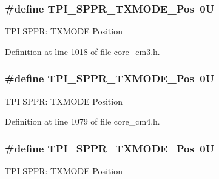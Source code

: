 \subsubsection[{\texorpdfstring{T\+P\+I\+\_\+\+S\+P\+P\+R\+\_\+\+T\+X\+M\+O\+D\+E\+\_\+\+Pos}{TPI_SPPR_TXMODE_Pos}}]{\setlength{\rightskip}{0pt plus 5cm}\#define T\+P\+I\+\_\+\+S\+P\+P\+R\+\_\+\+T\+X\+M\+O\+D\+E\+\_\+\+Pos~0U}\hypertarget{group___c_m_s_i_s___t_p_i_ga0f302797b94bb2da24052082ab630858}{}\label{group___c_m_s_i_s___t_p_i_ga0f302797b94bb2da24052082ab630858}
T\+PI S\+P\+PR\+: T\+X\+M\+O\+DE Position 

Definition at line 1018 of file core\+\_\+cm3.\+h.

\subsubsection[{\texorpdfstring{T\+P\+I\+\_\+\+S\+P\+P\+R\+\_\+\+T\+X\+M\+O\+D\+E\+\_\+\+Pos}{TPI_SPPR_TXMODE_Pos}}]{\setlength{\rightskip}{0pt plus 5cm}\#define T\+P\+I\+\_\+\+S\+P\+P\+R\+\_\+\+T\+X\+M\+O\+D\+E\+\_\+\+Pos~0U}\hypertarget{group___c_m_s_i_s___t_p_i_ga0f302797b94bb2da24052082ab630858}{}\label{group___c_m_s_i_s___t_p_i_ga0f302797b94bb2da24052082ab630858}
T\+PI S\+P\+PR\+: T\+X\+M\+O\+DE Position 

Definition at line 1079 of file core\+\_\+cm4.\+h.

\subsubsection[{\texorpdfstring{T\+P\+I\+\_\+\+S\+P\+P\+R\+\_\+\+T\+X\+M\+O\+D\+E\+\_\+\+Pos}{TPI_SPPR_TXMODE_Pos}}]{\setlength{\rightskip}{0pt plus 5cm}\#define T\+P\+I\+\_\+\+S\+P\+P\+R\+\_\+\+T\+X\+M\+O\+D\+E\+\_\+\+Pos~0U}\hypertarget{group___c_m_s_i_s___t_p_i_ga0f302797b94bb2da24052082ab630858}{}\label{group___c_m_s_i_s___t_p_i_ga0f302797b94bb2da24052082ab630858}
T\+PI S\+P\+PR\+: T\+X\+M\+O\+DE Position 

